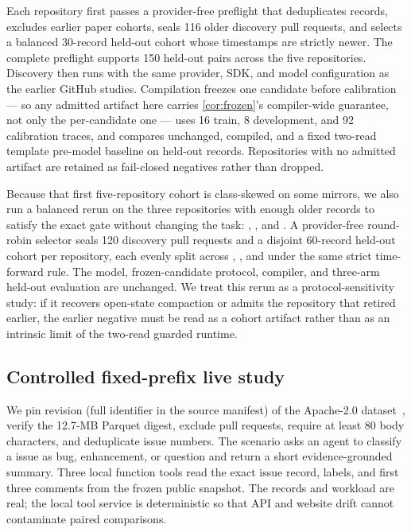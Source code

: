 Each repository first passes a provider-free preflight that deduplicates records, excludes
earlier paper cohorts, seals 116 older discovery pull requests, and selects a balanced
30-record held-out cohort whose timestamps are strictly newer.  The complete preflight
supports 150 held-out pairs across the five repositories.  Discovery then runs with the
same provider, SDK, and model configuration as the earlier GitHub studies.  Compilation
freezes one candidate before calibration --- so any admitted artifact here carries
\cref{cor:frozen}'s compiler-wide guarantee, not only the per-candidate one --- uses 16
train, 8 development, and 92 calibration traces, and compares unchanged, compiled, and a
fixed two-read template pre-model baseline on held-out records.  Repositories with no
admitted artifact are retained as fail-closed negatives rather than dropped.

Because that first five-repository cohort is class-skewed on some mirrors, we also run a
balanced rerun on the three repositories with enough older records to satisfy the exact
gate without changing the task: , , and
.  A provider-free round-robin selector seals 120 discovery pull
requests and a disjoint 60-record held-out cohort per repository, each evenly split
across , , and  under the same strict
time-forward rule.  The model, frozen-candidate protocol, compiler, and three-arm held-out
evaluation are unchanged.  We treat this rerun as a protocol-sensitivity study: if it
recovers open-state compaction or admits the repository that retired earlier, the earlier
negative must be read as a cohort artifact rather than as an intrinsic limit of the
two-read guarded runtime.

\subsection{Controlled fixed-prefix live study}

We pin revision  (full identifier in the source manifest) of the
Apache-2.0  dataset~\cite{githubissuesdataset}, verify the 12.7-MB Parquet
digest, exclude pull requests, require at least 80 body characters, and deduplicate issue
numbers.  The scenario asks an agent to classify a  issue as
bug, enhancement, or question and return a short evidence-grounded summary.  Three local
function tools read the exact issue record, labels, and first three comments from the
frozen public snapshot.  The records and workload are real; the local tool service is
deterministic so that API and website drift cannot contaminate paired comparisons.

